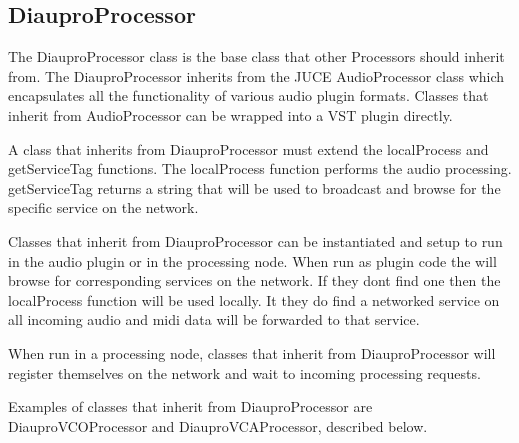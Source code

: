 \subsection{DiauproProcessor}

The DiauproProcessor class is the base class that other Processors should inherit from. The DiauproProcessor inherits from the JUCE AudioProcessor class which encapsulates all the functionality of various audio plugin formats. Classes that inherit from AudioProcessor can be wrapped into a VST plugin directly.

A class that inherits from DiauproProcessor must extend the localProcess and getServiceTag functions. The localProcess function performs the audio processing. getServiceTag returns a string that will be used to broadcast and browse for the specific service on the network.

Classes that inherit from DiauproProcessor can be instantiated and setup to run in the audio plugin  or in the processing node. When run as plugin code the will browse for corresponding services on the network. If they dont find one then the localProcess function will be used locally. It they do find a networked service on all incoming audio and midi data will be forwarded to that service.

When run in a processing node, classes that inherit from DiauproProcessor will register themselves on the network and wait to incoming processing requests.

Examples of classes that inherit from DiauproProcessor are DiauproVCOProcessor and DiauproVCAProcessor, described below.